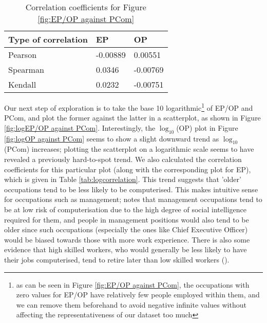 \documentclass[11pt]{article}
\begin{document}
\begin{table}[]
	\centering
	\begin{tabular}{l|ll|ll}
	\textbf{Type of correlation} & \multicolumn{2}{l|}{\textbf{EP}} & \multicolumn{2}{l}{\textbf{OP}} \\ \hline
	Pearson                      & \multicolumn{2}{l|}{-0.00889}     & \multicolumn{2}{l}{0.00551}      \\ \hline
	Spearman                     & \multicolumn{2}{l|}{0.0346}      & \multicolumn{2}{l}{-0.00769}    \\ \hline
	Kendall                      & \multicolumn{2}{l|}{0.0232}      & \multicolumn{2}{l}{-0.00751}   
	\end{tabular}
	\caption{Correlation coefficients for Figure \ref{fig:EP/OP against PCom}}
	\label{tab:correlation}
	\end{table}


Our next step of exploration is to take the base 10 logarithmic\footnote{as can be seen in Figure \ref{fig:EP/OP against PCom}, the occupations with zero values for EP/OP have relatively few people employed within them, and we can remove them beforehand to avoid negative infinite values without affecting the representativeness of our dataset too much} of EP/OP and PCom, and plot the former against the latter in a scatterplot, as shown in Figure \ref{fig:logEP/OP against PCom}. Interestingly, the $\log_{10}$(OP) plot in Figure \ref{fig:logOP against PCom} seems to show a slight downward trend as $\log_{10}$(PCom) increases; plotting the scatterplot on a logarithmic scale seems to have revealed a previously hard-to-spot trend. We also calculated the correlation coefficients for this particular plot (along with the corresponding plot for EP), which is given in Table \ref{tab:logcorrelation}. This trend suggests that 'older' occupations tend to be less likely to be computerised. This makes intuitive sense for occupations such as management; \cite{osborne2017future} notes that management occupations tend to be at low risk of computerisation due to the high degree of social intelligence required for them, and people in management positions would also tend to be older since such occupations (especially the ones like Chief Executive Officer) would be biased towards those with more work experience. There is also some evidence that high skilled workers, who would generally be less likely to have their jobs computerised, tend to retire later than low skilled workers (\cite{HimmelreicherRalfK.2009Saao}).
\end{document}
